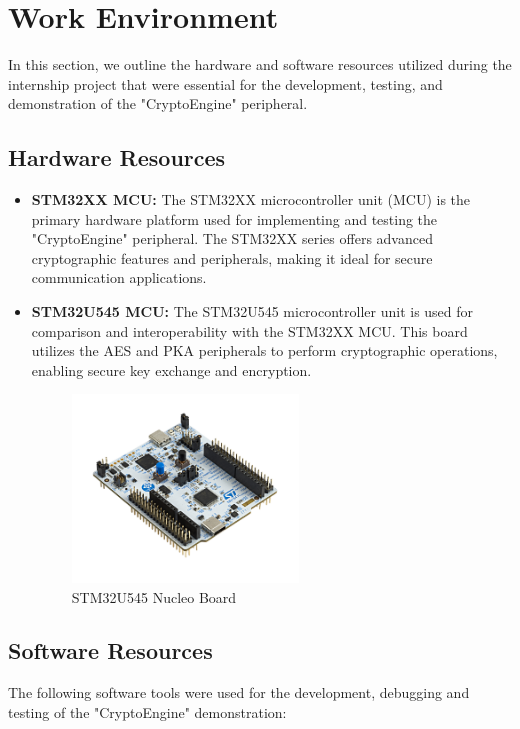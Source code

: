\section{Work Environment}
In this section, we outline the hardware and software resources utilized during the internship project that were essential for the development, testing, and demonstration of the "CryptoEngine" peripheral.

\subsection{Hardware Resources}
\begin{itemize}
    \item \textbf{STM32XX MCU:} The STM32XX microcontroller unit (MCU) is the primary hardware platform used for implementing and testing the "CryptoEngine" peripheral. The STM32XX series offers advanced cryptographic features and peripherals, making it ideal for secure communication applications.
    \item \textbf{STM32U545 MCU:} The STM32U545 microcontroller unit is used for comparison and interoperability with the STM32XX MCU. This board utilizes the AES and PKA peripherals to perform cryptographic operations, enabling secure key exchange and encryption.
    \begin{figure}[H]
  \centering
  \includegraphics[width=6cm]{img/U5 Nucleo.jpg}
  \caption{STM32U545 Nucleo Board}
  \label{fig:stm32u545n}
\end{figure}
\end{itemize}

\subsection{Software Resources}
The following software tools were used for the  development, debugging and testing of the "CryptoEngine" demonstration:

